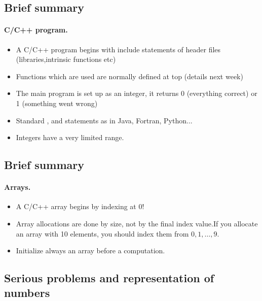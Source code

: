 \documentclass[%
twoside,                 %
final,                   %
10pt]{article}
\newenvironment{paragraphadmon}[1][]{\paragraph{#1}}{}
\begin{document}
\subsection{Brief summary}


\begin{paragraphadmon}[C/C++ program.]
\begin{itemize}
  \item A C/C++ program begins with include statements of header files (libraries,intrinsic functions etc)

  \item Functions which are used are normally defined at top (details next week)

  \item The main program is set up as an integer, it returns 0 (everything correct) or 1 (something went wrong)

  \item Standard ,  and  statements as in Java, Fortran, Python...

  \item Integers have a very limited range.
\end{itemize}

\noindent
\end{paragraphadmon}



\subsection{Brief summary}


\begin{paragraphadmon}[Arrays.]
\begin{itemize}
  \item A C/C++ array begins by indexing at 0!

  \item Array allocations are done by size, not by the final index value.If you allocate an array with 10 elements, you should index them from $0,1,\dots, 9$.

  \item Initialize always an array before a computation.
\end{itemize}

\noindent
\end{paragraphadmon}



\subsection{Serious problems and representation of numbers}
\end{document}

